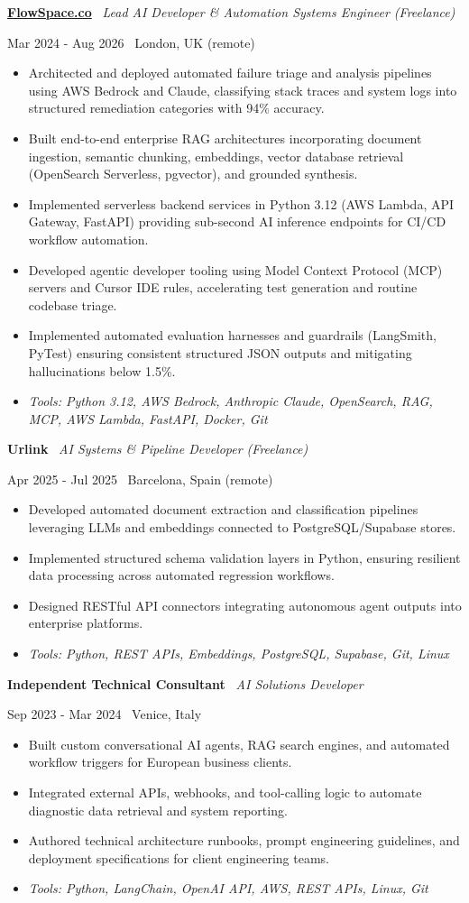 \documentclass[a4paper,10pt]{article}
\newcommand{\role}[4]{%
  \vspace{2pt}\noindent
  \begin{minipage}[t]{0.70\textwidth}\raggedright\textbf{#1} \textbullet\ \textit{#3}\end{minipage}%
  \hfill
  \begin{minipage}[t]{0.28\textwidth}\raggedleft\footnotesize\color{gray}#2 \textbullet\ #4\end{minipage}%
  \vspace{1pt}%
}
\begin{document}
\role{\href{https://flowspace.co}{FlowSpace.co}}{Mar 2024 - Aug 2026}{Lead AI Developer \& Automation Systems Engineer (Freelance)}{London, UK (remote)}
\begin{itemize}
  \item Architected and deployed automated failure triage and analysis pipelines using AWS Bedrock and Claude, classifying stack traces and system logs into structured remediation categories with 94\% accuracy.
  \item Built end-to-end enterprise RAG architectures incorporating document ingestion, semantic chunking, embeddings, vector database retrieval (OpenSearch Serverless, pgvector), and grounded synthesis.
  \item Implemented serverless backend services in Python 3.12 (AWS Lambda, API Gateway, FastAPI) providing sub-second AI inference endpoints for CI/CD workflow automation.
  \item Developed agentic developer tooling using Model Context Protocol (MCP) servers and Cursor IDE rules, accelerating test generation and routine codebase triage.
  \item Implemented automated evaluation harnesses and guardrails (LangSmith, PyTest) ensuring consistent structured JSON outputs and mitigating hallucinations below 1.5\%.
  \item \textit{Tools: Python 3.12, AWS Bedrock, Anthropic Claude, OpenSearch, RAG, MCP, AWS Lambda, FastAPI, Docker, Git}
\end{itemize}

\role{Urlink}{Apr 2025 - Jul 2025}{AI Systems \& Pipeline Developer (Freelance)}{Barcelona, Spain (remote)}
\begin{itemize}
  \item Developed automated document extraction and classification pipelines leveraging LLMs and embeddings connected to PostgreSQL/Supabase stores.
  \item Implemented structured schema validation layers in Python, ensuring resilient data processing across automated regression workflows.
  \item Designed RESTful API connectors integrating autonomous agent outputs into enterprise platforms.
  \item \textit{Tools: Python, REST APIs, Embeddings, PostgreSQL, Supabase, Git, Linux}
\end{itemize}

\role{Independent Technical Consultant}{Sep 2023 - Mar 2024}{AI Solutions Developer}{Venice, Italy}
\begin{itemize}
  \item Built custom conversational AI agents, RAG search engines, and automated workflow triggers for European business clients.
  \item Integrated external APIs, webhooks, and tool-calling logic to automate diagnostic data retrieval and system reporting.
  \item Authored technical architecture runbooks, prompt engineering guidelines, and deployment specifications for client engineering teams.
  \item \textit{Tools: Python, LangChain, OpenAI API, AWS, REST APIs, Linux, Git}
\end{itemize}
\end{document}
